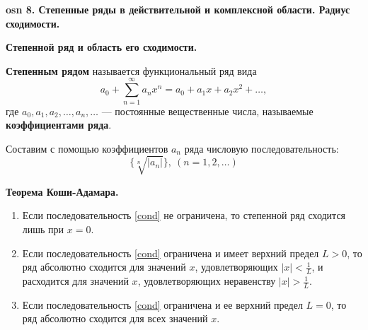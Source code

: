 \textbf{\LARGE osn 8. Степенные ряды в действительной и комплексной области. Радиус сходимости.}

\textbf{Степенной ряд и область его сходимости.}

\textbf{Степенным рядом} называется функциональный ряд вида
$$ a_0 + \displaystyle\sum_{n=1}^{\infty}a_n x^n =a_0 +a_1 x+a_2 x^2 +\dots,$$
где $a_0, a_1, a_2,\dots, a_n,\dots$ --- постоянные вещественные числа, называемые \textbf{коэффициентами ряда}.

Составим с помощью коэффициентов $a_n$ ряда числовую последовательность:
\begin{equation}
    \{\sqrt[n]{|a_n|}\},~(n = 1,2,\dots)
    \label{cond}
\end{equation}

\textbf{Теорема Коши-Адамара.}
\begin{enumerate}
    \item Если последовательность \ref{cond} не ограничена, то степенной ряд сходится лишь при $x = 0$.
    \item Если последовательность \ref{cond} ограничена и имеет верхний предел $L > 0$, то ряд абсолютно сходится для значений $x$, удовлетворяющих $|x| < \frac{1}{L}$, и расходится для значений $x$, удовлетворяющих неравенству $|x| > \frac{1}{L}$.
    \item Если последовательность \ref{cond} ограничена и ее верхний предел $L = 0$, то ряд абсолютно сходится для всех значений $x$.
\end{enumerate}

